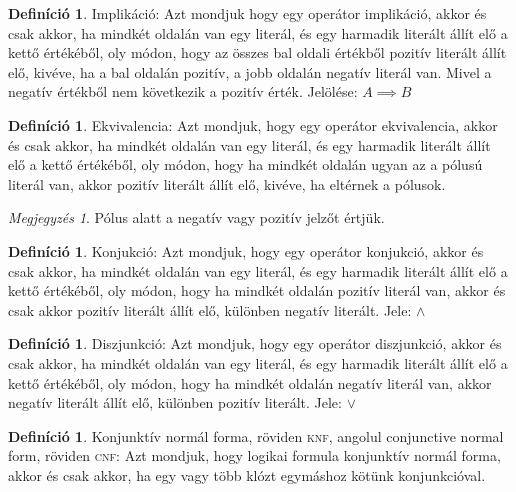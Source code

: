 \documentclass[
]{thesis-ekf}
\theoremstyle{definition}
\newtheorem{definicio}[tetel]{Definíció}
\theoremstyle{remark}
\newtheorem{megjegyzes}[tetel]{Megjegyzés}
\begin{document}
	\begin{definicio}
		Implikáció: Azt mondjuk hogy egy operátor implikáció, akkor és csak akkor, ha mindkét oldalán van egy literál, és egy harmadik literált állít elő a kettő értékéből, oly módon, hogy az összes bal oldali értékből pozitív literált állít elő, kivéve, ha a bal oldalán pozitív, a jobb oldalán negatív literál van.
		Mivel a negatív értékből nem következik a pozitív érték. Jelölése: $ A \implies B $
	\end{definicio}

	\begin{definicio}
		Ekvivalencia: Azt mondjuk, hogy egy operátor ekvivalencia, akkor és csak akkor, ha mindkét oldalán van egy literál, és egy harmadik literált állít elő a kettő értékéből, oly módon, hogy ha mindkét oldalán ugyan az a pólusú literál van, akkor pozitív literált állít elő, kivéve, ha eltérnek a pólusok.
	\end{definicio}

	\begin{megjegyzes}
		Pólus alatt a negatív vagy pozitív jelzőt értjük.
	\end{megjegyzes}

	\begin{definicio}
		Konjukció: Azt mondjuk, hogy egy operátor konjukció, akkor és csak akkor, ha mindkét oldalán van egy literál, és egy harmadik literált állít elő a kettő értékéből, oly módon, hogy ha mindkét oldalán pozitív literál van, akkor és csak akkor pozitív literált állít elő, különben negatív literált. Jele: $\wedge$
	\end{definicio}

	\begin{definicio}
		Diszjunkció: Azt mondjuk, hogy egy operátor diszjunkció, akkor és csak akkor, ha mindkét oldalán van egy literál, és egy harmadik literált állít elő a kettő értékéből, oly módon, hogy ha mindkét oldalán negatív literál van, akkor negatív literált állít elő, különben pozitív literált. Jele: $\vee$
	\end{definicio}

	\begin{definicio}\label{cnf} %
		Konjunktív normál forma, röviden \textsc{knf}, angolul conjunctive normal form, röviden \textsc{cnf}: Azt mondjuk, hogy logikai formula konjunktív normál forma, akkor és csak akkor, ha egy vagy több klózt egymáshoz kötünk konjunkcióval.
	\end{definicio}
\end{document}
